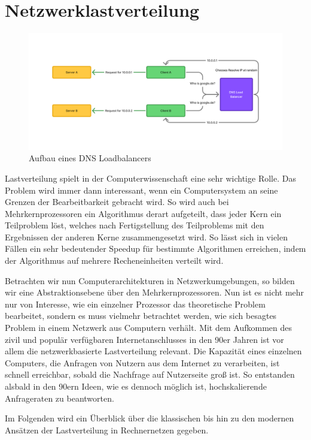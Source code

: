 \chapter{Netzwerklastverteilung}
\begin{figure}
    \centering
    \includegraphics[width=1.1\linewidth]{images/DNS Loadbalancer(1).png}
    \caption{Aufbau eines DNS Loadbalancers}
    \label{fig:enter-label}
\end{figure}
Lastverteilung spielt in der Computerwissenschaft eine sehr wichtige Rolle. Das Problem wird immer dann interessant, wenn ein Computersystem an seine Grenzen der Bearbeitbarkeit gebracht wird. So wird auch bei Mehrkernprozessoren ein Algorithmus derart aufgeteilt, dass jeder Kern ein Teilproblem löst, welches nach Fertigstellung des Teilproblems mit den Ergebnissen der anderen Kerne zusammengesetzt wird. So lässt sich in vielen Fällen ein sehr bedeutender Speedup für bestimmte Algorithmen erreichen, indem der Algorithmus auf mehrere Recheneinheiten verteilt wird.

Betrachten wir nun Computerarchitekturen in Netzwerkumgebungen, so bilden wir eine Abstraktionsebene über den Mehrkernprozessoren. Nun ist es nicht mehr nur von Interesse, wie ein einzelner Prozessor das theoretische Problem bearbeitet, sondern es muss vielmehr betrachtet werden, wie sich besagtes Problem in einem Netzwerk aus Computern verhält. Mit dem Aufkommen des zivil und populär verfügbaren Internetanschlusses in den 90er Jahren ist vor allem die netzwerkbasierte Lastverteilung relevant. Die Kapazität eines einzelnen Computers, die Anfragen von Nutzern aus dem Internet zu verarbeiten, ist schnell erreichbar, sobald die Nachfrage auf Nutzerseite groß ist. So entstanden alsbald in den 90ern Ideen, wie es dennoch möglich ist, hochskalierende Anfrageraten zu beantworten. 

Im Folgenden wird ein Überblick über die klassischen bis hin zu den modernen Ansätzen der Lastverteilung in Rechnernetzen gegeben.

